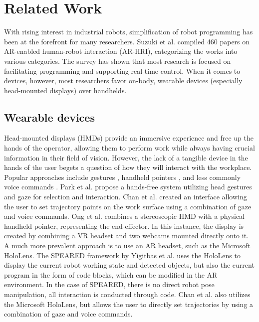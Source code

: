 \chapter{Related Work}
With rising interest in industrial robots, simplification of robot programming has been at the forefront for many researchers. Suzuki et al.\cite{suzuki2022augmented} compiled 460 papers on AR-enabled human-robot interaction (AR-HRI), categorizing the works into various categories. The survey has shown that most research is focused on facilitating programming and supporting real-time control. When it comes to devices, however, most researchers favor on-body, wearable devices (especially head-mounted displays) over handhelds. 

\section{Wearable devices}
Head-mounted displays (HMDs) provide an immersive experience and free up the hands of the operator, allowing them to perform work while always having crucial information in their field of vision. However, the lack of a tangible device in the hands of the user begets a question of how they will interact with the workplace. Popular approaches include gestures \cite{voicelargescale, handsfree, packing}, handheld pointers \cite{2009, speared}, and less commonly voice commands \cite{voicelargescale}. Park et al.\cite{handsfree} propose a hands-free system utilizing head gestures and gaze for selection and interaction. Chan et al.\cite{voicelargescale} created an interface allowing the user to set trajectory points on the work surface using a combination of gaze and voice commands. Ong et al.\cite{ONG2020101820} combines a stereoscopic HMD with a physical handheld pointer, representing the end-effector. In this instance, the display is created by combining a VR headset and two webcams mounted directly onto it. A much more prevalent approach is to use an AR headset, such as the Microsoft HoloLens. The SPEARED framework by Yigitbas et al.\cite{speared} uses the HoloLens to display the current robot working state and detected objects, but also the current program in the form of code blocks, which can be modified in the AR environment. In the case of SPEARED, there is no direct robot pose manipulation, all interaction is conducted through code. Chan et al.\cite{voicelargescale} also utilizes the Microsoft HoloLens, but allows the user to directly set trajectories by using a combination of gaze and voice commands. 


